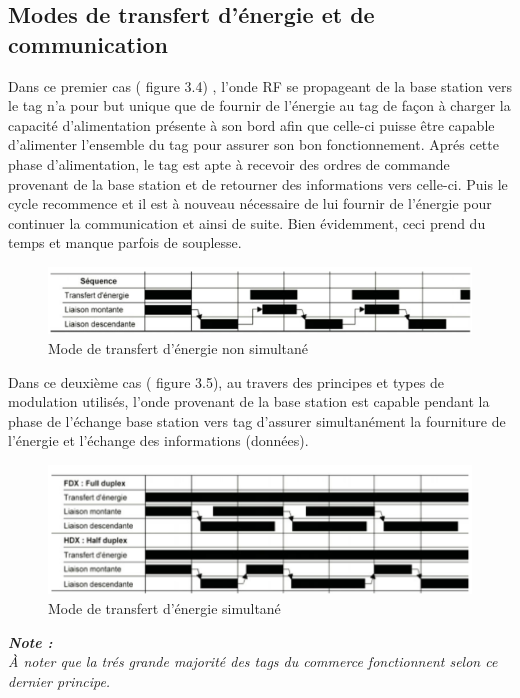 \documentclass[11pt, a4paper, twoside]{book}
\begin{document}
\subsection{Modes de transfert d’énergie et de communication}
Dans ce premier cas ( figure 3.4) , l’onde RF se propageant de la base station vers le tag n’a pour but unique que de fournir de l’énergie au tag de façon à charger la  capacité d’alimentation  présente à son bord afin que celle-ci puisse être capable d’alimenter l’ensemble du tag pour assurer son bon fonctionnement. Aprés cette phase d'alimentation, le tag est apte à recevoir des ordres de commande provenant de la base station et de retourner des informations vers celle-ci. Puis le cycle recommence et il est à nouveau nécessaire de lui fournir de l'énergie pour continuer la communication et ainsi de suite. Bien évidemment, ceci prend du temps et manque parfois de souplesse.\\
\begin{figure}[h!]
\centering
\includegraphics[width=\textwidth]{figa}
\caption{Mode de transfert d'énergie non simultané}
\end{figure}

Dans ce deuxième cas ( figure 3.5), au travers des principes et types de modulation utilisés, l'onde provenant de la base station est capable pendant la phase de l'échange base station vers tag d'assurer simultanément la fourniture de l'énergie et l'échange des informations (données).\\

\begin{figure}[h!]
\centering
\includegraphics[width=\textwidth]{figb}
\caption{Mode de transfert d'énergie simultané}
\end{figure}

\begin{center}
\textbf{\emph{Note :}}\\
\emph{À noter que la trés grande majorité des tags du commerce fonctionnent selon ce dernier principe.}
\end{center}
\end{document}
